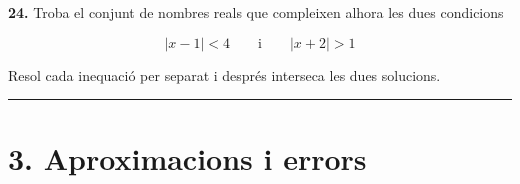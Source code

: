 \documentclass[13pt,a4paper]{extarticle}
\begin{document}
\par\noindent\begin{minipage}{\linewidth}
\textbf{24.} Troba el conjunt de nombres reals que compleixen alhora les dues condicions\par

$$|x-1|<4 \qquad\text{i}\qquad |x+2|>1$$\par

Resol cada inequació per separat i després interseca les dues solucions.\par
\end{minipage}\par\vspace{1.6mm}
\vspace{1mm}\hrule\vspace{3mm}

\section*{3. Aproximacions i errors}
\end{document}
